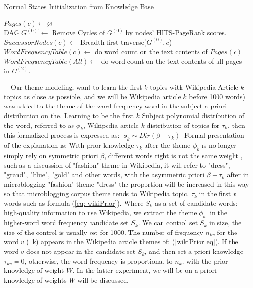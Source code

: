 \documentclass[11pt]{article}
\begin{document}
\begin{algorithm}
\caption{Normal States Initialization from Knowledge Base}
\label{alg:normalStatesInit}

\(Pages(c)\leftarrow \varnothing\)\\
DAG \(G^{(0)'} \leftarrow\) Remove Cycles of \(G^{(0)}\) by nodes' HITS-PageRank scores. \\
\(SuccessorNodes(c) \leftarrow \) Breadth-first-traverse(\(G^{(0)},c\))\\
\(WordFrequencyTable(c) \leftarrow \) do word count on the text contents of \(Pages(c)\) \\
\(WordFrequencyTable(All) \leftarrow \) do word count on the text contents of all pages in \(G^{(2)}\).\\
\end{algorithm}

\ \ Our theme modeling, want to learn the first \(k\) topics with Wikipedia Article \(k\) topics as close as possible, and we will be Wikipedia article \(k\) before 1000 words) was added to the theme of the word frequency word in the subject a priori distribution on the.
Learning to be the first \(k\) Subject polynomial distribution of the word, referred to as \(\phi_k \), Wikipedia article \(k \) distribution of topics for \(\tau_k \), then this formalized process is expressed as: \(\ \phi_k \sim Dir(\beta + \tau_k) \).
Formal presentation of the explanation is: With prior knowledge \(\tau_k \) after the theme \(\phi_k \) is no longer simply rely on symmetric priori \(\beta \), different words right is not the same weight , such as a discussion of "fashion" theme in Wikipedia, it will refer to "dress", "grand", "blue", "gold" and other words, with the asymmetric priori \(\beta + \tau_k \) after in microblogging "fashion" theme "dress" the proportion will be increased in this way so that microblogging corpus theme tends to Wikipedia topic.
\(\tau_k \) in the first \(v \) words such as formula (\ref{eq: wikiPrior}).
Where \(S_k \) as a set of candidate words: high-quality information to use Wikipedia, we extract the theme \(\phi_k \ \) in the higher-word word frequency candidate set \(S_k \).
We can control set \(S_k \) in size, the size of the control is usually set for 1000.
The number of frequency \(n_{kv} \) for the word \(v \) (\ k) appears in the Wikipedia article themes of: (\ref{wikiPrior eq}).
If the word \(v \) does not appear in the candidate set \(S_k \), and then set a priori knowledge \(\tau_{kv} = 0 \), otherwise, the word frequency is proportional to \(n_{kv} \) with the prior knowledge of weight \(W\).
In the latter experiment, we will be on a priori knowledge of weights \(W \) will be discussed. 
\end{document}
